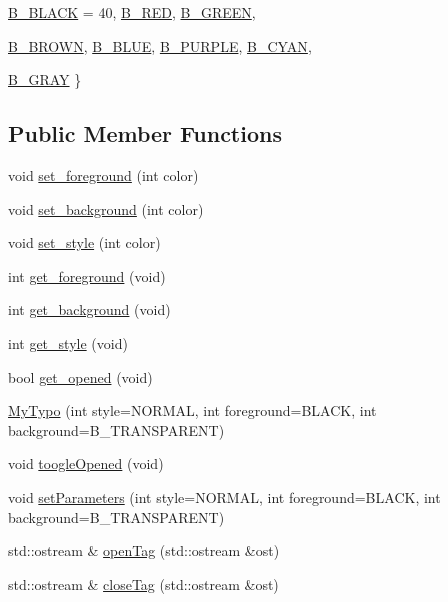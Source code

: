 \begin{DoxyCompactItemize}
\hyperlink{classMyTypo_ac6643b465e94f6ecb7fb650c4b3531e8ac2e0d75a46d7044e594d4f89cb76b4ca}{B\_\-BLACK} =  40, 
\hyperlink{classMyTypo_ac6643b465e94f6ecb7fb650c4b3531e8aeb1941bfc2f16a35302f10000684a6ef}{B\_\-RED}, 
\hyperlink{classMyTypo_ac6643b465e94f6ecb7fb650c4b3531e8aac6076a603ab6c8be9a700e115c01453}{B\_\-GREEN}, 
\par
\hyperlink{classMyTypo_ac6643b465e94f6ecb7fb650c4b3531e8afd8a2faa10bc6f4f68066e8a8064ec3f}{B\_\-BROWN}, 
\hyperlink{classMyTypo_ac6643b465e94f6ecb7fb650c4b3531e8a08b6e71d66570f7a3e34cc7995e85317}{B\_\-BLUE}, 
\hyperlink{classMyTypo_ac6643b465e94f6ecb7fb650c4b3531e8a4d7b53c84bb3c21ca6adae139dca95de}{B\_\-PURPLE}, 
\hyperlink{classMyTypo_ac6643b465e94f6ecb7fb650c4b3531e8a6762080d090818122cabaf479be290a6}{B\_\-CYAN}, 
\par
\hyperlink{classMyTypo_ac6643b465e94f6ecb7fb650c4b3531e8a85f06fb2e3d8b757294edc6eecabf43e}{B\_\-GRAY}
 \}
\end{DoxyCompactItemize}
\subsection*{Public Member Functions}
\begin{DoxyCompactItemize}
\item 
void \hyperlink{classMyTypo_a3422166dfc3911a36c32271e0434587d}{set\_\-foreground} (int color)
\item 
void \hyperlink{classMyTypo_a325589499eb8e5c4b52355011f7b9cf3}{set\_\-background} (int color)
\item 
void \hyperlink{classMyTypo_a94dc39fef3ca57dc956deda92514c648}{set\_\-style} (int color)
\item 
int \hyperlink{classMyTypo_a554372a4548dda7c157d69fe0651a23f}{get\_\-foreground} (void)
\item 
int \hyperlink{classMyTypo_ad935060c132f772a2a1239bc6426d5de}{get\_\-background} (void)
\item 
int \hyperlink{classMyTypo_af181779fdfb0eb793136408e2a4fec94}{get\_\-style} (void)
\item 
bool \hyperlink{classMyTypo_ad44b40659d3e5cf17f22677264ca6ab9}{get\_\-opened} (void)
\item 
\hyperlink{classMyTypo_a7ab56324aa7eb1bf6efca62d14d07bee}{MyTypo} (int style=NORMAL, int foreground=BLACK, int background=B\_\-TRANSPARENT)
\item 
void \hyperlink{classMyTypo_ac0cf15a492908e3efdc6b57e1eff4390}{toogleOpened} (void)
\item 
void \hyperlink{classMyTypo_ab1f48a8f65a17b5240c393af75ef2657}{setParameters} (int style=NORMAL, int foreground=BLACK, int background=B\_\-TRANSPARENT)
\item 
std::ostream \& \hyperlink{classMyTypo_ae352299f62ef344e98f10a900546c83c}{openTag} (std::ostream \&ost)
\item 
std::ostream \& \hyperlink{classMyTypo_a6572b9b25e66990a26308e6bbc9ec301}{closeTag} (std::ostream \&ost)
\end{DoxyCompactItemize}



